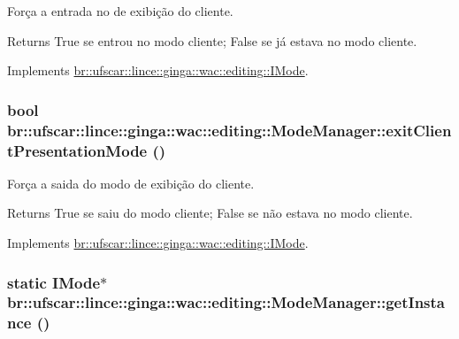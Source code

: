 Força a entrada no de exibição do cliente. 

\begin{DoxyReturn}{Returns}
True se entrou no modo cliente; False se já estava no modo cliente. 
\end{DoxyReturn}


Implements \hyperlink{classbr_1_1ufscar_1_1lince_1_1ginga_1_1wac_1_1editing_1_1IMode_ab6b8c4de92a5f940f8c726f327f9aa55}{br::ufscar::lince::ginga::wac::editing::IMode}.

\hypertarget{classbr_1_1ufscar_1_1lince_1_1ginga_1_1wac_1_1editing_1_1ModeManager_a7d095b1de1af73c3296f4b6a29c6f08f}{
\subsubsection[{exitClientPresentationMode}]{\setlength{\rightskip}{0pt plus 5cm}bool br::ufscar::lince::ginga::wac::editing::ModeManager::exitClientPresentationMode ()}}
\label{classbr_1_1ufscar_1_1lince_1_1ginga_1_1wac_1_1editing_1_1ModeManager_a7d095b1de1af73c3296f4b6a29c6f08f}


Força a saida do modo de exibição do cliente. 

\begin{DoxyReturn}{Returns}
True se saiu do modo cliente; False se não estava no modo cliente. 
\end{DoxyReturn}


Implements \hyperlink{classbr_1_1ufscar_1_1lince_1_1ginga_1_1wac_1_1editing_1_1IMode_a36555fd659519e30880b9d3f4644d257}{br::ufscar::lince::ginga::wac::editing::IMode}.

\hypertarget{classbr_1_1ufscar_1_1lince_1_1ginga_1_1wac_1_1editing_1_1ModeManager_a1a25cc97eb5724636f205765e03ad785}{
\subsubsection[{getInstance}]{\setlength{\rightskip}{0pt plus 5cm}static {\bf IMode}$\ast$ br::ufscar::lince::ginga::wac::editing::ModeManager::getInstance ()}}
\label{classbr_1_1ufscar_1_1lince_1_1ginga_1_1wac_1_1editing_1_1ModeManager_a1a25cc97eb5724636f205765e03ad785}


